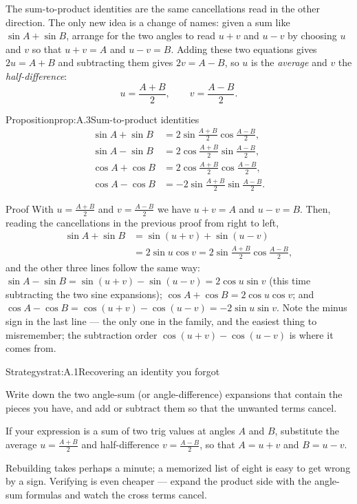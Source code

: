 \documentclass[a4paper,12pt,oneside]{memoir}
\begin{document}
The sum-to-product identities are the same cancellations read in the other direction. The only new idea is a change of names: given a sum like \(\sin A + \sin B\), arrange for the two angles to read \(u + v\) and \(u - v\) by choosing \(u\) and \(v\) so that \(u + v = A\) and \(u - v = B\). Adding these two equations gives \(2u = A + B\) and subtracting them gives \(2v = A - B\), so \(u\) is the \emph{average} and \(v\) the \emph{half-difference}: \[ u = \frac{A + B}{2}, \qquad v = \frac{A - B}{2}. \]

\begin{envproposition}{Proposition}{prop:A.3}{Sum-to-product identities}
\[ \begin{aligned} \sin A + \sin B &= 2 \sin\frac{A + B}{2} \cos\frac{A - B}{2}, \\ \sin A - \sin B &= 2 \cos\frac{A + B}{2} \sin\frac{A - B}{2}, \\ \cos A + \cos B &= 2 \cos\frac{A + B}{2} \cos\frac{A - B}{2}, \\ \cos A - \cos B &= -2 \sin\frac{A + B}{2} \sin\frac{A - B}{2}. \end{aligned} \]
\end{envproposition}
\begin{envproof}{Proof}{}{}
With \(u = \tfrac{A+B}{2}\) and \(v = \tfrac{A-B}{2}\) we have \(u + v = A\) and \(u - v = B\). Then, reading the cancellations in the previous proof from right to left, \[ \begin{aligned} \sin A + \sin B &= \sin(u + v) + \sin(u - v) \\ &= 2 \sin u \cos v = 2 \sin\frac{A + B}{2} \cos\frac{A - B}{2}, \end{aligned} \] and the other three lines follow the same way: \(\sin A - \sin B = \sin(u+v) - \sin(u-v) = 2 \cos u \sin v\) (this time subtracting the two sine expansions); \(\cos A + \cos B = 2 \cos u \cos v\); and \(\cos A - \cos B = \cos(u+v) - \cos(u-v) = -2 \sin u \sin v\). Note the minus sign in the last line — the only one in the family, and the easiest thing to misremember; the subtraction order \(\cos(u+v) - \cos(u-v)\) is where it comes from. \qedmark
\end{envproof}
\begin{envstrategy}{Strategy}{strat:A.1}{Recovering an identity you forgot}
\begin{steps}
  \item Write down the two angle-sum (or angle-difference) expansions that contain the pieces you have, and add or subtract them so that the unwanted terms cancel.
  \item If your expression is a sum of two trig values at angles \(A\) and \(B\), substitute the average \(u = \tfrac{A+B}{2}\) and half-difference \(v = \tfrac{A-B}{2}\), so that \(A = u + v\) and \(B = u - v\).
\end{steps}
\begin{informal}
Rebuilding takes perhaps a minute; a memorized list of eight is easy to get wrong by a sign. Verifying is even cheaper — expand the product side with the angle-sum formulas and watch the cross terms cancel.
\end{informal}
\end{envstrategy}
\end{document}
